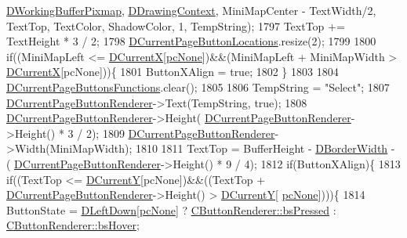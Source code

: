 \begin{DoxyCode}
      \hyperlink{classCApplicationData_afa34cf2780f38dd28c0c811e69d60a97}{DWorkingBufferPixmap}, \hyperlink{classCApplicationData_aa6c5bea9bdcc64398e5a3f693661d37c}{DDrawingContext}, MiniMapCenter - TextWidth/2, 
      TextTop, TextColor, ShadowColor, 1, TempString);
1797     TextTop += TextHeight * 3 / 2;
1798     \hyperlink{classCApplicationData_a3615df8e23cea3ce17f11cf61340a7b4}{DCurrentPageButtonLocations}.resize(2);
1799     
1800     \textcolor{keywordflow}{if}((MiniMapLeft <= \hyperlink{classCApplicationData_a1dc7ee482a39f7978c71365ac540f97a}{DCurrentX}[\hyperlink{GameDataTypes_8h_aafb0ca75933357ff28a6d7efbdd7602fa88767aa8e02c7b3192bbab4127b3d729}{pcNone}])&&(MiniMapLeft + MiniMapWidth > 
      \hyperlink{classCApplicationData_a1dc7ee482a39f7978c71365ac540f97a}{DCurrentX}[pcNone]))\{
1801         ButtonXAlign = \textcolor{keyword}{true};
1802     \}
1803     
1804     \hyperlink{classCApplicationData_ad3079e5563a19d21c1e4ceff2a188382}{DCurrentPageButtonsFunctions}.clear();
1805     
1806     TempString = \textcolor{stringliteral}{"Select"};
1807     \hyperlink{classCApplicationData_abfe1743f2634b069ccc811db4a8733a8}{DCurrentPageButtonRenderer}->Text(TempString, \textcolor{keyword}{true});   
1808     \hyperlink{classCApplicationData_abfe1743f2634b069ccc811db4a8733a8}{DCurrentPageButtonRenderer}->Height(
      \hyperlink{classCApplicationData_abfe1743f2634b069ccc811db4a8733a8}{DCurrentPageButtonRenderer}->Height() * 3 / 2);
1809     \hyperlink{classCApplicationData_abfe1743f2634b069ccc811db4a8733a8}{DCurrentPageButtonRenderer}->Width(MiniMapWidth);
1810     
1811     TextTop = BufferHeight - \hyperlink{classCApplicationData_a566b69c72fa982c6ecf8e47dc21df489}{DBorderWidth} - (
      \hyperlink{classCApplicationData_abfe1743f2634b069ccc811db4a8733a8}{DCurrentPageButtonRenderer}->Height() * 9 / 4);
1812     \textcolor{keywordflow}{if}(ButtonXAlign)\{
1813         \textcolor{keywordflow}{if}((TextTop <= \hyperlink{classCApplicationData_a0ba39779ae11c8072258c6ddfebd6052}{DCurrentY}[pcNone])&&((TextTop + 
      \hyperlink{classCApplicationData_abfe1743f2634b069ccc811db4a8733a8}{DCurrentPageButtonRenderer}->Height() > \hyperlink{classCApplicationData_a0ba39779ae11c8072258c6ddfebd6052}{DCurrentY}[
      \hyperlink{GameDataTypes_8h_aafb0ca75933357ff28a6d7efbdd7602fa88767aa8e02c7b3192bbab4127b3d729}{pcNone}])))\{
1814             ButtonState = \hyperlink{classCApplicationData_a2b943f18557c3e4c8cd4550e22e028b6}{DLeftDown}[\hyperlink{GameDataTypes_8h_aafb0ca75933357ff28a6d7efbdd7602fa88767aa8e02c7b3192bbab4127b3d729}{pcNone}] ? 
      \hyperlink{classCButtonRenderer_ae0eccda184600f6e14bfd59033e5e9a1a8fad69630f3700a97a0c51bcbb4441b5}{CButtonRenderer::bsPressed} : \hyperlink{classCButtonRenderer_ae0eccda184600f6e14bfd59033e5e9a1ad6758a415bde0eee152a0e2f7d07e3b6}{CButtonRenderer::bsHover};

\end{DoxyCode}
